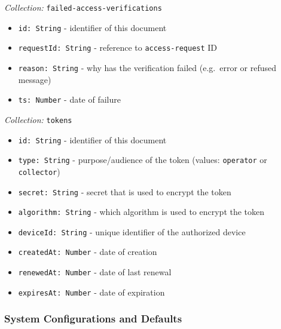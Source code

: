 \documentclass[12pt,english,a4paper,titlepage,cleardoublepage=empty,dottedtoc]{report}
\providecommand{\tightlist}{%
  \setlength{\itemsep}{0pt}\setlength{\parskip}{0pt}}
\begin{document}
\emph{Collection:} \texttt{failed-access-verifications}

\begin{itemize}
\tightlist
\item
  \texttt{id:\ String} - identifier of this document
\item
  \texttt{requestId:\ String} - reference to \texttt{access-request} ID
\item
  \texttt{reason:\ String} - why has the verification failed (e.g.~error
  or refused message)
\item
  \texttt{ts:\ Number} - date of failure
\end{itemize}

\emph{Collection:} \texttt{tokens}

\begin{itemize}
\tightlist
\item
  \texttt{id:\ String} - identifier of this document
\item
  \texttt{type:\ String} - purpose/audience of the token (values:
  \texttt{operator} or \texttt{collector})
\item
  \texttt{secret:\ String} - secret that is used to encrypt the token
\item
  \texttt{algorithm:\ String} - which algorithm is used to encrypt the
  token
\item
  \texttt{deviceId:\ String} - unique identifier of the authorized
  device
\item
  \texttt{createdAt:\ Number} - date of creation
\item
  \texttt{renewedAt:\ Number} - date of last renewal
\item
  \texttt{expiresAt:\ Number} - date of expiration
\end{itemize}

\subsubsection{System Configurations and
Defaults}\label{system-configurations-and-defaults}
\end{document}
